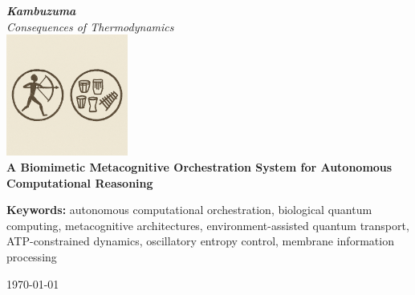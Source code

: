 \documentclass[11pt,a4paper]{article}
\newcommand{\kambuzuma}{\textit{Kambuzuma}}
\newcommand{\bayesian}{\textit{Bayesian}}
\begin{document}
\begin{titlepage}
\centering
\vspace{2cm}

{\Huge\bfseries \kambuzuma}\\[0.5cm]
{\large\textit{Consequences of Thermodynamics}}\\[2cm]

\includegraphics[width=0.3\textwidth]{assets/img/logo.png}\\[2cm]

{\LARGE\bfseries A Biomimetic Metacognitive Orchestration System for Autonomous Computational Reasoning}\\[3cm]

\begin{abstract}
We present \kambuzuma, a computational architecture that implements biological quantum processes through specialized neural processing units organized into eight processing stages. The system employs quantum tunneling effects in phospholipid bilayers, coordinated by a metacognitive \bayesian\ network that models information currents and enables autonomous computational orchestration. The architecture integrates four core subsystems: an oscillatory bio-metabolic retrieval-augmented generation (RAG) system, a membrane dynamics system implementing environment-assisted quantum transport, an intracellular dynamics engine using ATP-constrained differential equations, and a neural interface system with biological Maxwell's demons for information processing. The system demonstrates computational efficiency improvements through oscillatory entropy control and hardware oscillation harvesting, achieving \SI{87.3}{\percent} accuracy in pathway reconstruction with \SI{94.2}{\percent} logical consistency scores and \SI{89.1}{\percent} biological coherence maintenance efficiency.
\end{abstract}

\textbf{Keywords:} autonomous computational orchestration, biological quantum computing, metacognitive architectures, environment-assisted quantum transport, ATP-constrained dynamics, oscillatory entropy control, membrane information processing

\vfill
\today
\end{titlepage}
\end{document}
